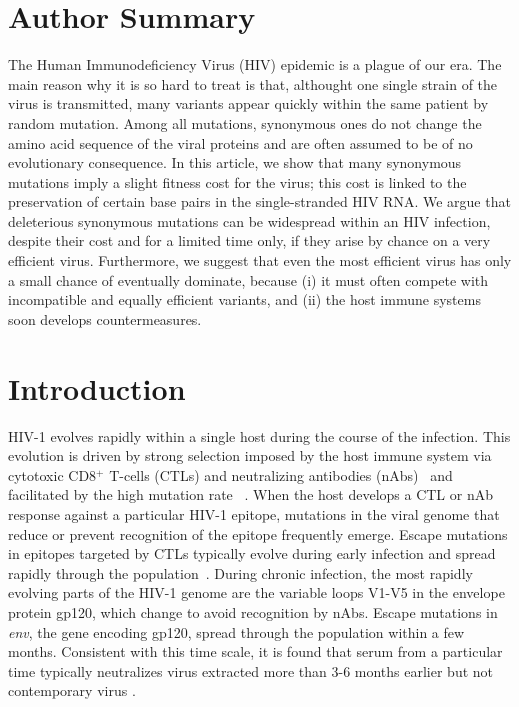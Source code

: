 \documentclass[10pt]{article}
\newcommand{\env}{\textit{env}}
\begin{document}
\section*{Author Summary}
The Human Immunodeficiency Virus (HIV) epidemic is a plague of our era. The
main reason why it is so hard to treat is that, althought one single strain of
the virus is transmitted, many variants appear quickly within the same patient
by random mutation. Among all mutations, synonymous ones do not change the amino
acid sequence of the viral proteins and are often assumed to be of no
evolutionary consequence. In this article, we show that many synonymous
mutations imply a slight fitness cost for the virus; this cost is
linked to the preservation of certain base pairs in the single-stranded HIV RNA.
We argue that deleterious synonymous mutations can be widespread within an HIV
infection, despite their cost and for a limited time only, if they arise by
chance on a very efficient virus. Furthermore, we suggest that even the most
efficient virus has only a small chance of eventually dominate, because
(i) it must often compete with incompatible and equally efficient variants, and
(ii) the host immune systems soon develops countermeasures.

\section*{Introduction}
HIV-1 evolves rapidly within a single host during the course of the infection.
This evolution is driven by strong selection imposed by the host immune system
via cytotoxic CD8${}^+$ T-cells (CTLs) and neutralizing antibodies
(nAbs)~\cite{rambaut_causes_2004} and facilitated by the high mutation rate
~\cite{mansky_lower_1995,abram_nature_2010}. When the host develops a CTL or
nAb response against a particular HIV-1 epitope, mutations in the viral genome that
reduce or prevent recognition of the epitope frequently emerge. Escape mutations
in epitopes targeted by CTLs typically evolve during early infection and spread
rapidly through the population~\cite{mcmichael_immune_2009}. During chronic
infection, the most rapidly evolving parts of the HIV-1 genome are the variable
loops V1-V5 in the envelope protein gp120, which change to avoid recognition by
nAbs. Escape mutations in \env, the gene encoding gp120, spread through the
population within a few months.
Consistent with this time scale, it is found that serum from a particular time
typically neutralizes virus extracted more than 3-6 months earlier but not contemporary
virus \cite{richman_rapid_2003}.
\end{document}
